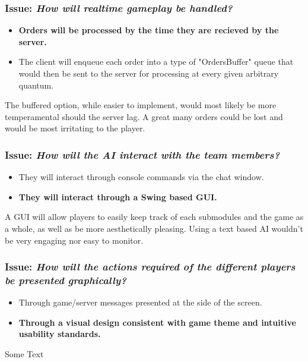 \subsubsection*{Issue: \textit{How will realtime gameplay be handled?}}

  \begin{itemize}
    \item \textbf{Orders will be processed by the time they are recieved by the server.}
    \item The client will enqueue each order into a type of "OrdersBuffer" queue that would then be sent to the server for processing at every given arbitrary quantum.
  \end{itemize}

The buffered option, while easier to implement, would most likely be more temperamental should the server lag. A great many orders could be lost and would be most irritating to the player.

\subsubsection*{Issue: \textit{How will the AI interact with the team members?}}

  \begin{itemize}
    \item They will interact through console commands via the chat window.
    \item \textbf{They will interact through a Swing based GUI.}
  \end{itemize}

A GUI will allow players to easily keep track of each submodules and the game as a whole, as well as be more aesthetically pleasing. Using a text based AI wouldn't be very engaging nor easy to monitor.

\subsubsection*{Issue: \textit{How will the actions required of the different players be presented graphically?}}

  \begin{itemize}
    \item Through game/server messages presented at the side of the screen.
    \item \textbf{Through a visual design consistent with game theme and intuitive usability standards.}
  \end{itemize}

Some Text
